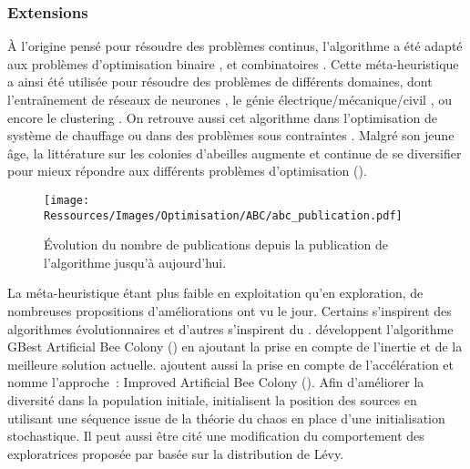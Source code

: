 \subsubsection{Extensions} %
\label{ssub:extensions}
À l’origine pensé pour résoudre des problèmes continus, l’algorithme a été adapté aux problèmes
d’optimisation binaire \parencite{Kashan2012342}, et combinatoires \parencite{Karaboga20113021}.
Cette méta-heuristique a ainsi été utilisée pour résoudre des problèmes de différents
domaines, dont l’entraînement de réseaux de neurones \parencite{Karaboga2007},
le génie électrique/mécanique/civil \parencite{Rao2009887}, ou encore le
clustering \parencite{Zhang20104761}. On retrouve aussi cet algorithme dans l’optimisation
de système de chauffage \parencite{Atashkari2011} ou dans des problèmes sous
contraintes \parencite{Tsai201480,Karaboga20113021}. Malgré son jeune âge, la littérature
sur les colonies d’abeilles augmente et continue de se diversifier pour mieux répondre
aux différents problèmes d’optimisation ().

\begin{figure}
    \centering
    \texttt{[image: Ressources/Images/Optimisation/ABC/abc\_publication.pdf]}
    \caption[Évolution du nombre de publication utilisant l’algorithme ]
            {Évolution du nombre de publications depuis la publication de l’algorithme  jusqu’à aujourd’hui.}
    \label{fig:abc_publication}
\end{figure}

La méta-heuristique étant plus faible en exploitation qu’en exploration, de nombreuses
propositions d’améliorations ont vu le jour. Certains s’inspirent des algorithmes
évolutionnaires \parencite{Bi2011174,Zhao2010558} et d’autres s’inspirent du .
\textcite{Zhu20103166} développent l’algorithme GBest Artificial Bee Colony () en
ajoutant la prise en compte de l’inertie et de la meilleure solution actuelle.
\textcite{Li2012320} ajoutent aussi la prise en compte de l’accélération et nomme l’approche~:
Improved Artificial Bee Colony ().
Afin d’améliorer la diversité dans la population initiale, \textcite{Xiang20131256}
initialisent la position des sources en utilisant une séquence issue de la théorie
du chaos en place d’une initialisation stochastique. Il peut aussi être cité
une modification du comportement des exploratrices proposée par \textcite{Sharma2012213}
basée sur la distribution de Lévy.

